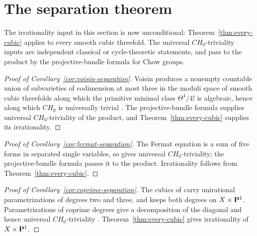 \section{The separation theorem}
\label{sec:synthesis}

The irrationality input in this section is now unconditional:
Theorem~\ref{thm:every-cubic} applies to every smooth cubic threefold.  The
universal \(CH_0\)-triviality inputs are independent classical or
cycle-theoretic statements, and pass to the product by the projective-bundle
formula for Chow groups.

\begin{proof}[Proof of Corollary~\ref{cor:voisin-separation}]
Voisin produces a nonempty countable union of subvarieties of codimension at
most three in the moduli space of smooth cubic threefolds along which the
primitive minimal class \(\Theta^4/4!\) is algebraic, hence along which
\(CH_0\) is universally trivial \cite[Theorem~4.5 and Lemma~4.6]{Voisin}.
The projective-bundle formula supplies universal \(CH_0\)-triviality of the
product, and Theorem~\ref{thm:every-cubic} supplies its irrationality.
%
%
%
\end{proof}

\begin{proof}[Proof of Corollary~\ref{cor:fermat-separation}]
The Fermat equation is a sum of five forms in separated single variables, so
\cite{CT} gives universal \(CH_0\)-triviality; the projective-bundle formula
passes it to the product.  Irrationality follows from
Theorem~\ref{thm:every-cubic}.
%
%
%
\end{proof}

\begin{proof}[Proof of Corollary~\ref{cor:coprime-separation}]
The cubics of \cite[Theorem~3.3]{YYZ} carry unirational parametrizations of
degrees two and three, and \cite[Corollary~3.5]{YYZ} keeps both degrees on
\(X\times\mathbf P^1\).  Parametrizations of coprime degrees give a decomposition
of the diagonal and hence universal \(CH_0\)-triviality
\cite[Section~1]{YYZ}.  Theorem~\ref{thm:every-cubic} gives irrationality of
\(X\times\mathbf P^1\).
%
%
%
\end{proof}

